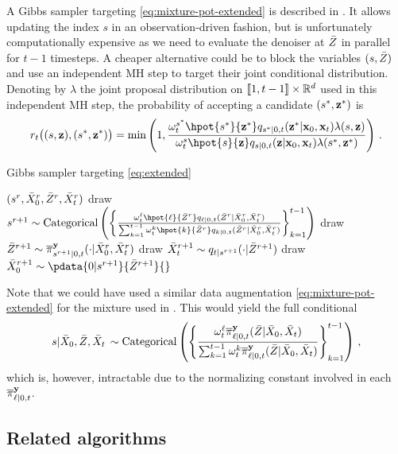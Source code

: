 A Gibbs sampler targeting \eqref{eq:mixture-pot-extended} is described in . It allows updating the index $s$ in an observation-driven fashion, but is unfortunately computationally expensive as we need to evaluate the denoiser at $\bar{Z}$ in parallel for $t-1$ timesteps. A cheaper alternative could be to block the variables $(s, \bar{Z})$ and use an independent MH step to target their joint conditional distribution. Denoting by $\lambda$ the joint proposal distribution on $\llbracket 1, t-1 \rrbracket \times \mathbb{R}^{d}$ used in this independent MH step, the probability of accepting a candidate $(s^*, \mathbf{z}^*)$ is 
$$ 
    r_t\big( (s, \bz), (s^*, \bz^*)\big) = \mbox{min}\left( 1, \frac{\wght^{s^*} _{t} \hpot{s^*}{\bz^*}\fw{s^* | 0, t}{\bx_0, \bx_t}{\bz^*} \lambda(s, \bz)}{\wght^{s} _{t} \hpot{s}{\bz}\fw{s | 0, t}{\bx_0, \bx_t}{\bz} \lambda(s^{*}, \bz^{*})} \right) \eqsp.
$$ 
\begin{algorithm}[h]
    \caption{Gibbs sampler targeting \eqref{eq:extended}}
    \begin{algorithmic}[1]
         $(s^r, \bar{X}^r _0, \bar{Z}^r, \bar{X}^r _t)$
        \STATE draw $s^{r+1} \sim \mbox{Categorical}\left( \left\{ \frac{\wght^\ell _t \hpot{\ell}{\bZy^r} \fw{\ell|0, t}{\bXy^r _0, \bXy^r _t}{\bZy^r}}{\sum_{k = 1}^{t-1} \wght^k _t \hpot{k}{\bZy^r} \fw{k|0, t}{\bXy^r _0, \bXy^r _t}{\bZy^r}}\right\}_{k = 1} ^{t-1} \right)$ 
        \STATE draw $\bZy^{r+1} \sim \epost{s^{r+1} |0, t}{\bXy^r _0, \bXy^r _t}{}$
        \STATE draw $\bXy^{r+1} _t \sim \fw{t|s^{r+1}}{\bZy^{r+1}}{}$ 
        \STATE draw $\bXy^{r+1} _0 \sim \pdata{0|s^{r+1}}{\bZy^{r+1}}{}$
    \end{algorithmic}
    \label{algo:mixturepot-extended-gibbs}
\end{algorithm}
\begin{remark} 
    \label{rem:mgdm-weight}
    Note that we could have used a similar data augmentation \eqref{eq:mixture-pot-extended} for the mixture used in \algo. This would yield the full conditional 
$$
    s | \bXy_0, \bZy, \bXy_t \, \sim \mbox{Categorical}\left( \left\{ \frac{\wght^\ell _t \epost{\ell|0, t}{\bXy_0, \bXy_t}{\bZy}}{\sum_{k = 1}^{t-1} \wght^k _t \epost{\ell|0, t}{\bXy_0, \bXy_t}{\bZy}}\right\}_{k = 1} ^{t-1} \right) \eqsp, 
$$
which is, however, intractable due to the normalizing constant involved in each $\epost{\ell|0, t}{}{}$. 
\end{remark}
\subsection{Related algorithms}
\label{apdx-sec:comparisons}

